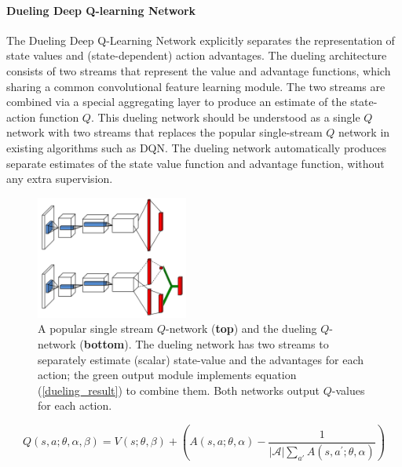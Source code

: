 \paragraph{Dueling Deep Q-learning Network} The Dueling Deep Q-Learning Network \cite{wang2015dueling} explicitly separates the representation of state values and (state-dependent) action advantages. The dueling architecture consists of two streams that represent the value and advantage functions, which sharing a common convolutional feature learning module. The two streams are combined via a special aggregating layer to produce an estimate of the state-action function $Q$. This dueling network should be understood as a single $Q$ network with two streams that replaces the popular single-stream $Q$ network in existing algorithms such as DQN. The dueling network automatically produces separate estimates of the state value function and advantage function, without any extra supervision.
\begin{figure}[h]
\centering
\includegraphics[width=5cm]{pic/dueling-architecture.PNG}
\caption{A popular single stream $Q$-network (\textbf{top}) and the dueling $Q$-network (\textbf{bottom}). The dueling network has two streams to separately estimate (scalar) state-value and the advantages for each action; the green output module implements equation (\ref{dueling_result}) to combine them. Both networks output $Q$-values for each action.} \label{dueling_architecture}

\end{figure}
\begin{equation} \label{dueling_result}
Q(s, a; \theta, \alpha, \beta) = V(s; \theta, \beta) + \left(A(s,a;\theta,\alpha) - \frac{1}{|\mathcal{A}|\sum_{a'}{}A(s,a^{'};\theta, \alpha)}\right)
\end{equation}
